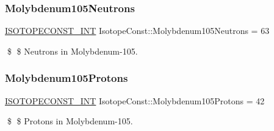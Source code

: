 \subsubsection{\texorpdfstring{Molybdenum105\+Neutrons}{Molybdenum105Neutrons}}
{\footnotesize\ttfamily \mbox{\hyperlink{group___isotope_const-_macros_ga5f18360b3e99483a35c32d789e62621c}{I\+S\+O\+T\+O\+P\+E\+C\+O\+N\+S\+T\+\_\+\+I\+NT}} Isotope\+Const\+::\+Molybdenum105\+Neutrons = 63}

\$ \$ Neutrons in Molybdenum-\/105. \mbox{\label{group___isotope_const-_molybdenum-_mo105_ga86666d6ff3253ab33c90601b8abe2ebc}} 
\subsubsection{\texorpdfstring{Molybdenum105\+Protons}{Molybdenum105Protons}}
{\footnotesize\ttfamily \mbox{\hyperlink{group___isotope_const-_macros_ga5f18360b3e99483a35c32d789e62621c}{I\+S\+O\+T\+O\+P\+E\+C\+O\+N\+S\+T\+\_\+\+I\+NT}} Isotope\+Const\+::\+Molybdenum105\+Protons = 42}

\$ \$ Protons in Molybdenum-\/105. 